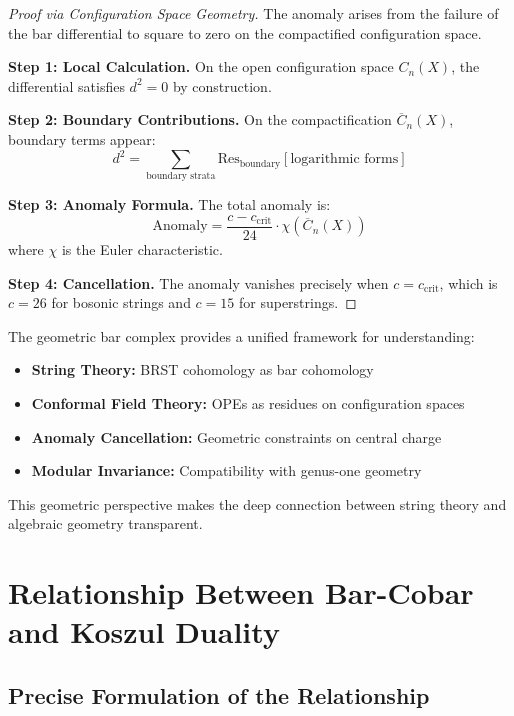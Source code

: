 \begin{proof}[Proof via Configuration Space Geometry]
The anomaly arises from the failure of the bar differential to square to zero on the compactified configuration space.

\textbf{Step 1: Local Calculation.} On the open configuration space $C_n(X)$, the differential satisfies $d^2 = 0$ by construction.

\textbf{Step 2: Boundary Contributions.} On the compactification $\overline{C}_n(X)$, boundary terms appear:
$$d^2 = \sum_{\text{boundary strata}} \text{Res}_{\text{boundary}}[\text{logarithmic forms}]$$

\textbf{Step 3: Anomaly Formula.} The total anomaly is:
$$\text{Anomaly} = \frac{c - c_{\text{crit}}}{24} \cdot \chi(\overline{C}_n(X))$$
where $\chi$ is the Euler characteristic.

\textbf{Step 4: Cancellation.} The anomaly vanishes precisely when $c = c_{\text{crit}}$, which is $c = 26$ for bosonic strings and $c = 15$ for superstrings.
\end{proof}

\begin{remark}
The geometric bar complex provides a unified framework for understanding:

\begin{itemize}
\item \textbf{String Theory:} BRST cohomology as bar cohomology
\item \textbf{Conformal Field Theory:} OPEs as residues on configuration spaces
\item \textbf{Anomaly Cancellation:} Geometric constraints on central charge
\item \textbf{Modular Invariance:} Compatibility with genus-one geometry
\end{itemize}

This geometric perspective makes the deep connection between string theory and algebraic geometry transparent.
\end{remark}

\section{Relationship Between Bar-Cobar and Koszul Duality}

\subsection{Precise Formulation of the Relationship}

